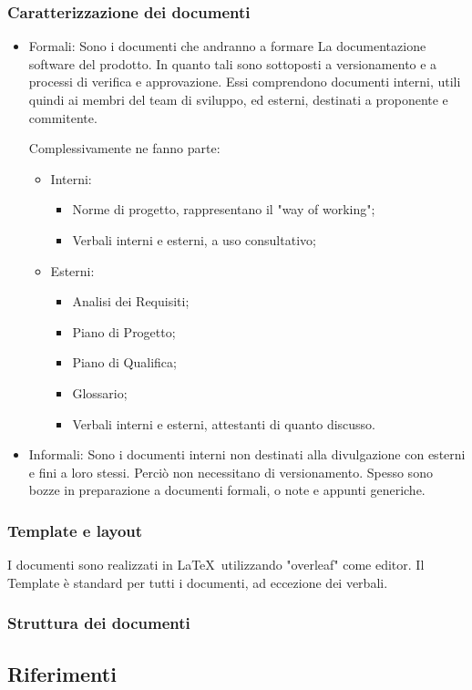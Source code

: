 \subsubsection{Caratterizzazione dei documenti}
\begin{itemize}
    \item Formali:
    Sono i documenti che andranno a formare La documentazione software del prodotto. In quanto tali sono sottoposti a versionamento e a processi di verifica e approvazione.
    Essi comprendono documenti interni, utili quindi ai membri del team di sviluppo, ed esterni, destinati a proponente e commitente.

    Complessivamente ne fanno parte:
    \begin{itemize}
        \item Interni: 
        \begin{itemize}
            \item Norme di progetto, rappresentano il "way of working";
            \item Verbali interni e esterni, a uso consultativo;
        \end{itemize}
        \item Esterni:
         \begin{itemize}
            \item Analisi dei Requisiti;
            \item Piano di Progetto; 
            \item Piano di Qualifica; 
            \item Glossario; 
            \item Verbali interni e esterni, attestanti di quanto discusso.
        \end{itemize}
    \end{itemize}
    \item Informali:
    Sono i documenti interni non destinati alla divulgazione con esterni e fini a loro stessi. Perciò non necessitano di versionamento.
    Spesso sono bozze in preparazione a documenti formali, o note e appunti generiche.
\end{itemize}
\subsubsection{Template e layout}
I documenti sono realizzati in \LaTeX\ utilizzando "overleaf" come editor. Il Template è standard per tutti i documenti, ad eccezione dei verbali.

\subsubsection{Struttura dei documenti}




\subsection{Riferimenti}
